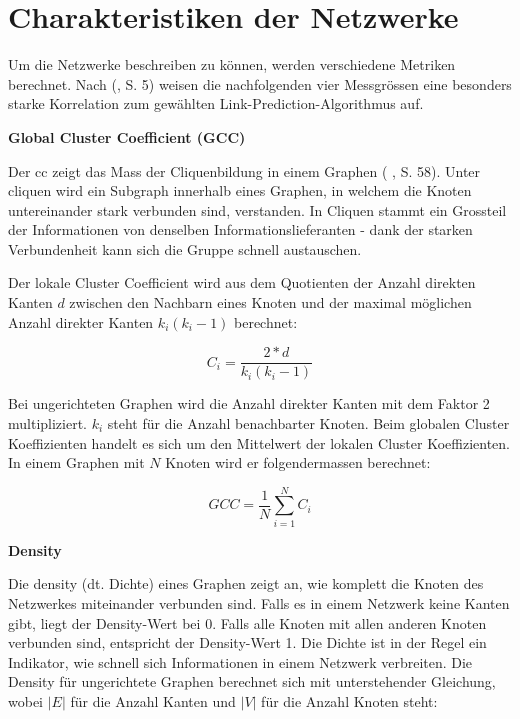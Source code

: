 \section{Charakteristiken der Netzwerke}
Um die Netzwerke beschreiben zu können, werden verschiedene Metriken berechnet.
Nach \citeauthor{gao_link_2015} (\citeyear{gao_link_2015}, S. 5) weisen die nachfolgenden vier Messgrössen eine besonders starke Korrelation zum gewählten Link-Prediction-Algorithmus auf.

\textbf{Global Cluster Coefficient (GCC)}

Der \acs{cc} zeigt das Mass der Cliquenbildung in einem Graphen (\citeauthor{michael_henninger_soziale_2018} \citeyear{michael_henninger_soziale_2018}, S. 58).
Unter \acs{clique}n wird ein Subgraph innerhalb eines Graphen, in welchem die Knoten untereinander stark verbunden sind, verstanden.
In Cliquen stammt ein Grossteil der Informationen von denselben Informationslieferanten - dank der starken Verbundenheit kann sich die Gruppe schnell austauschen.

Der lokale Cluster Coefficient wird aus dem Quotienten der Anzahl direkten Kanten $d$ zwischen den Nachbarn eines Knoten und der maximal möglichen Anzahl direkter Kanten $k_i(k_i -1)$ berechnet:

\begin{equation}
    \label{eq:ci}
    C_i = \frac{2*d}{k_i(k_i-1)}
\end{equation}

Bei ungerichteten Graphen wird die Anzahl direkter Kanten mit dem Faktor 2 multipliziert. $k_i$ steht für die Anzahl benachbarter Knoten.
Beim globalen Cluster Koeffizienten handelt es sich um den Mittelwert der lokalen Cluster Koeffizienten.
In einem Graphen mit $N$ Knoten wird er folgendermassen berechnet:

\begin{equation}
    \label{eq:gcc}
    GCC = \frac{1}{N}\sum\limits_{i=1}^{N}C_i
\end{equation}

\textbf{Density}

Die \acs{density} (dt. Dichte) eines Graphen zeigt an, wie komplett die Knoten des Netzwerkes miteinander verbunden sind.
Falls es in einem Netzwerk keine Kanten gibt, liegt der Density-Wert bei 0. Falls alle Knoten mit allen anderen Knoten verbunden sind, entspricht der Density-Wert 1.
Die Dichte ist in der Regel ein Indikator, wie schnell sich Informationen in einem Netzwerk verbreiten.
Die Density für ungerichtete Graphen berechnet sich mit unterstehender Gleichung, wobei $|E|$ für die Anzahl Kanten und $|V|$ für die Anzahl Knoten steht:


